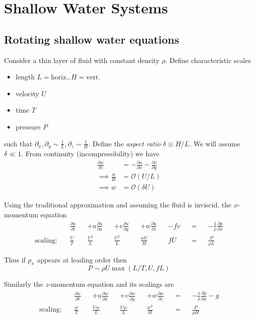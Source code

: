 \documentclass{jknotes}
\begin{document}
\section{Shallow Water Systems}
\subsection{Rotating shallow water equations}
Consider a thin layer of fluid with constant density $\rho$. Define
characteristic scales
\begin{itemize}
	\item length $L = \text{horiz.}, H = \text{vert.}$
	\item velocity $U$
	\item time $T$
	\item pressure $P$
\end{itemize}
such that $\partial_x, \partial_y \sim \frac{1}{L}, \partial_z \sim
\frac{1}{H}$. Define the \emph{aspect ratio} $\delta \equiv H/L$. We will
assume $\delta \ll 1$. From continuity (incompressibility) we have
\begin{equation}
	\begin{aligned}
		\frac{\partial w}{\partial z} &= -\frac{\partial u}{\partial x} -
		\frac{\partial v}{\partial y}  \\
		\implies \frac{w}{H} &= \mathcal{O}(U/L) \\
		\implies w &= \mathcal{O}(\delta U)
	\end{aligned}
\end{equation}

Using the traditional approximation and assuming the fluid is inviscid, the
$x$-momentum equation
\begin{align}
	&\frac{\partial u}{\partial t} &&+ u \frac{\partial u}{\partial x} &&+v
	\frac{\partial u}{\partial y} &&+ w\frac{\partial u}{\partial z} &&- fv &&=
						&&-\frac{1}{\rho} \frac{\partial p}{\partial x}
	\label{eq:swxmom}\\
	\text{scaling:}\hspace{1em} &\frac{U}{T} &&\frac{U^2}{L} && \frac{U^2}{L}
					&&\frac{wU}{H} &&fU &&= &&\frac{P}{\rho L}
\end{align}

Thus if $p_x$ appears at leading order then
\begin{equation}
	P \sim \rho U \max(L/T, U, fL)
\end{equation}

Similarly the $z$-momentum equation and its scalings are
\begin{align}
	&\frac{\partial w}{\partial t} &&+ u \frac{\partial w}{\partial x} &&+v
	\frac{\partial w}{\partial y} &&+ w\frac{\partial w}{\partial z} &&=
						&&-\frac{1}{\rho} \frac{\partial p}{\partial x} - g
	\label{eq:swzmom} \\
	\text{scaling:}\hspace{1em} &\frac{w}{T} &&\frac{Uw}{L} && \frac{Uw}{L}
					&&\frac{w^2}{H} &&= &&\frac{P}{\rho H}
\end{align}
\end{document}
